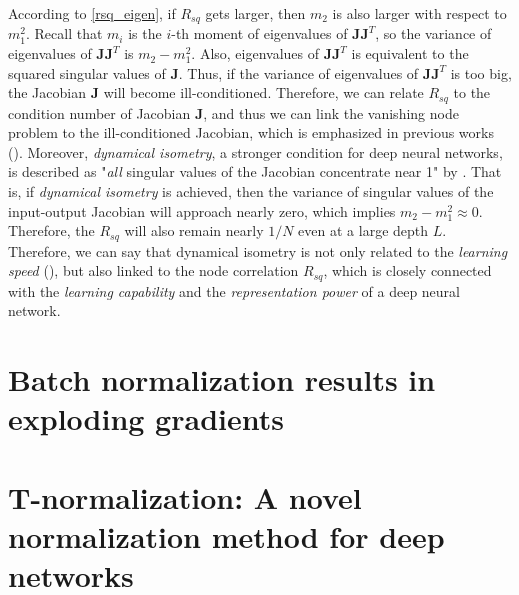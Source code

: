 According to \eqref{rsq_eigen}, if $R_{sq}$ gets larger, then $m_2$ is also larger with respect to
$m_1^2$. Recall that $m_i$ is the $i$-th moment of eigenvalues of $\mathbf{JJ}^T$, so the variance
of eigenvalues of $\mathbf{JJ}^T$ is $m_2-m_1^2$. Also, eigenvalues of $\mathbf{JJ}^T$ is equivalent
to the squared singular values of $\mathbf{J}$. Thus, if the variance of eigenvalues of $\mathbf{JJ}^T$
is too big, the Jacobian $\mathbf{J}$ will become ill-conditioned. Therefore, we can relate $R_{sq}$
to the condition number of Jacobian $\mathbf{J}$, and thus we can link the vanishing node problem to
the ill-conditioned Jacobian, which is emphasized in previous works (\cite{mft:sigmoid, mft:spectral,
mft:linear}).
Moreover, \textit{dynamical isometry}, a stronger condition for deep neural networks, is described
as "\textit{all} singular values of the Jacobian concentrate near 1" by \cite{mft:sigmoid, mft:linear}.
That is, if \textit{dynamical isometry} is achieved, then the variance of singular values of the
input-output Jacobian will approach nearly zero, which implies $m_2-m_1^2\approx 0$. Therefore,
the $R_{sq}$ will also remain nearly $1/N$ even at a large depth $L$.
Therefore, we can say that dynamical isometry is not only related to the \textit{learning speed}
(\cite{mft:linear}), but also linked to the node correlation $R_{sq}$, which is closely connected
with the \textit{learning capability} and the \textit{representation power} of a deep neural network.



% 

\section{Batch normalization results in exploding gradients} \label{comp:bn}

\section{T-normalization: A novel normalization method for deep networks} \label{comp:tn}
